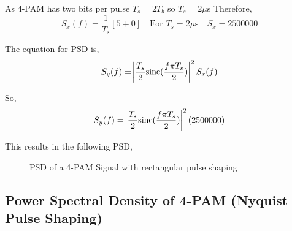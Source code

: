 As 4-PAM has two bits per pulse $T_s = 2 T_b$ so $T_s = 2 \mu$s Therefore,
\begin{equation}
    \label{eqn:sx-real}
    S_x(f) = \frac{1}{T_s} [5 + 0] \quad \textrm{For $T_s = 2\mu$s} \quad S_x=2500000
\end{equation}

The equation for PSD is,
\begin{equation}
    \label{eqn:PSD-4-PAM-rect}
    S_y(f) = \abs{\frac{T_s}{2} \textrm{sinc} ( \frac{f \pi T_s}{2} )}^2 S_x(f)
\end{equation}

So,
\begin{equation}
    \label{eqn:sy-value}
    S_y(f) = \abs{\frac{T_s}{2} \textrm{sinc}({\frac{f \pi T_s}{2}})}^2 (2500000)
\end{equation}
    
This results in the following PSD,
\begin{figure}[h]
    \begin{center}
        
        \caption{PSD of a 4-PAM Signal with rectangular pulse shaping}
    \end{center}
\end{figure}

\subsection{Power Spectral Density of 4-PAM (Nyquist Pulse Shaping)}
    